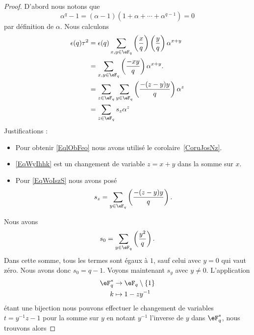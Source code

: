 \begin{proof}
	D'abord nous notons que
	\begin{equation}
		\alpha^q-1=(\alpha-1)(1+\alpha+\cdots+\alpha^{q-1})=0
	\end{equation}
	par définition de \( \alpha\). Nous calculons
	\begin{subequations}
		\begin{align}
			\epsilon(q)\tau^2 & =\epsilon(q)\sum_{x,y\in \eF_q}\left(\frac{x}{q}\right)\left(\frac{y}{q}\right)\alpha^{x+y}     \\
			                  & =\sum_{x,y\in \eF_q}\left(\frac{-xy}{q}\right)\alpha^{x+y}.                    \label{EqlObFeo} \\
			                  & =\sum_{z\in \eF_q}\sum_{y\in \eF_q}\left(\frac{-(z-y)y}{q}\right)\alpha^{z}    \label{EqWyIhhk} \\
			                  & =\sum_{z\in \eF_q}s_z\alpha^z                                                  \label{EqWoIszS}
		\end{align}
	\end{subequations}
	Justifications :
	\begin{itemize}
		\item
		      Pour obtenir \eqref{EqlObFeo} nous avons utilisé le corolaire~\ref{CoruJosNz}.
		\item
		      \eqref{EqWyIhhk} est un changement de variable \( z=x+y\) dans la somme sur \( x\).
		\item
		      Pour \eqref{EqWoIszS} nous avons posé
		      \begin{equation}
			      s_z=\sum_{y\in \eF_q}\left(\frac{-(z-y)y}{q}\right).
		      \end{equation}
	\end{itemize}
	Nous avons
	\begin{equation}
		s_0=\sum_{y\in \eF_q}\left(\frac{y^2}{q}\right).
	\end{equation}
	Dans cette somme, tous les termes sont égaux à \( 1\), sauf celui avec \( y=0\) qui vaut zéro. Nous avons donc \( s_0=q-1\). Voyons maintenant \( s_y\) avec \( y\neq 0\). L'application
	\begin{equation}
		\begin{aligned}
			\eF^*_q & \to \eF_q\setminus\{ 1 \} \\
			k       & \mapsto 1-zy^{-1}
		\end{aligned}
	\end{equation}
	étant une bijection nous pouvons effectuer le changement de variables \( t=y^{-1}z-1\) pour la somme sur \( y\) en notant \( y^{-1}\) l'inverse de \( y\) dans \( \eF^*_q\), nous trouvons alors

\end{proof}
